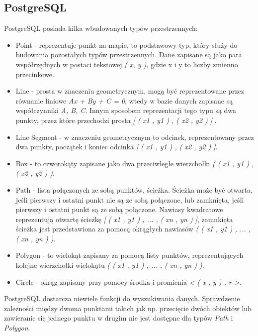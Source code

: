 \documentclass[printmode]{mgr}
\begin{document}
\subsection{PostgreSQL}
PostgreSQL posiada kilka wbudowanych typów przestrzennych\cite{doc_postgresql}: 
\begin{itemize}
  \item Point - reprezentuje punkt na mapie, to podstawowy typ, który służy do budowania pozostałych typów przestrzennych. Dane zapisane są jako para współrzędnych w postaci tekstowej \textit{( x, y )}, gdzie x i y to liczby zmienno przecinkowe.
  \item Line - prosta w znaczeniu geometrycznym, mogą być reprezentowane przez równanie liniowe \textit{Ax + By + C = 0}, wtedy w bazie danych zapisane są współczynniki \textit{A, B, C}. Innym sposobem reprezentacji tego typu są dwa punkty, przez które przechodzi prosta \textit{[ ( x1 , y1 ) , ( x2 , y2 ) ]
  }.
  \item Line Segment - w znaczeniu geometrycznym to odcinek, reprezentowany przez dwa punkty, początek i koniec odcinka \textit{[ ( x1 , y1 ) , ( x2 , y2 ) ]}.
  \item Box - to czworokąty zapisane jako dwa przeciwległe wierzchołki \textit{( ( x1 , y1 ) , ( x2 , y2 ) )}.
  \item Path - lista połączonych ze sobą punktów, ścieżka. Ścieżka może być otwarta, jeśli pierwszy i ostatni punkt nie są ze sobą połączone, lub zamknięta, jeśli pierwszy i ostatni punkt są ze sobą połączone. Nawiasy kwadratowe reprezentują otwartę ścieżkę \textit{[ ( x1 , y1 ) , ... , ( xn , yn ) ]}, zamnkięta ścieżka jest przedstawiona za pomocą okrągłych nawiasów \textit{( ( x1 , y1 ) , ... , ( xn , yn ) )}.
  \item Polygon - to wielokąt zapisany za pomocą listy punktów, reprezentujących kolejne wierzchołki wielokątu \textit{( ( x1 , y1 ) , ... , ( xn , yn ) )}.
  \item Circle - okrąg zapisany przy pomocy środka i promienia \textit{< ( x , y ) , r >}.
\end{itemize}
PostgreSQL dostarcza niewiele funkcji do wyszukiwania danych. Sprawdzenie zależności między dwoma punktami takich jak np. przecięcie dwóch obiektów lub zawieranie się jednego punktu w drugim nie jest dostępne dla typów \textit{Path} i \textit{Polygon}. 
\end{document}
